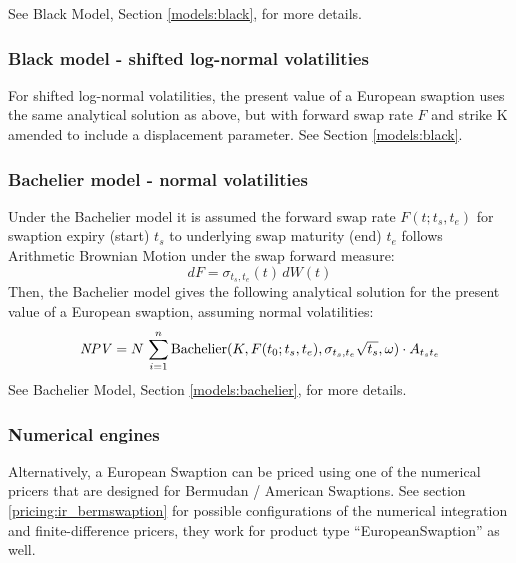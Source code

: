 See Black Model, Section \ref{models:black}, for more details.

\subsubsection*{Black model - shifted log-normal volatilities}

For shifted log-normal volatilities, the present value of a European swaption 
uses the same analytical solution as above, but with forward swap rate $F$ and 
strike K amended to include a displacement parameter.  
See Section \ref{models:black}.

\subsubsection*{Bachelier model - normal volatilities}

Under the Bachelier model it is assumed the forward swap rate $F(t; t_s, t_e)$  
for swaption expiry (start) $t_s$ to underlying swap maturity (end) $t_e$ follows 
Arithmetic Brownian Motion under the swap forward measure:
$$
dF=\sigma_{t_s,t_e}(t)\,dW(t)
$$
Then, the Bachelier model gives the following analytical solution for the 
present value of a European swaption, assuming normal volatilities:
$$
\mathit{NPV}=N\,\sum_{i=1}^n\mbox{Bachelier}(K,F(t_0; t_s, t_e),\sigma_{t_s,t_e}\sqrt{t_s},\omega)\cdot A_{t_s t_e}
$$
See Bachelier Model, Section \ref{models:bachelier}, for more details.

\subsubsection*{Numerical engines}

Alternatively, a European Swaption can be priced using one of the numerical pricers that are designed for Bermudan /
American Swaptions. See section \ref{pricing:ir_bermswaption} for possible configurations of the numerical integration
and finite-difference pricers, they work for product type ``EuropeanSwaption'' as well.
